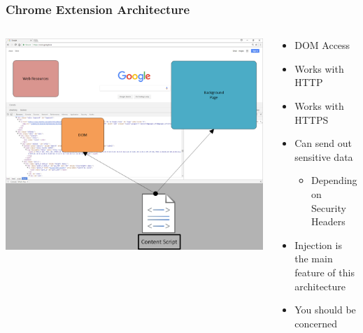 \documentclass[aspectratio=169]{beamer}
\begin{document}
\begin{frame}
  \frametitle{Chrome Extension Architecture}
  \begin{columns}
    \begin{column}{0.5\textwidth}
      \includegraphics[scale=0.42]{extensionarch}
    \end{column}
    \begin{column}{0.5\textwidth}
      \begin{itemize}
      \item DOM Access
      \item Works with HTTP
      \item Works with HTTPS
      \item Can send out sensitive data
        \begin{itemize}
          \item Depending on Security Headers
        \end{itemize}
      \item Injection is the main feature of this architecture
        \item You should be concerned
      \end{itemize}
    \end{column}
  \end{columns}
\end{frame}
\end{document}
